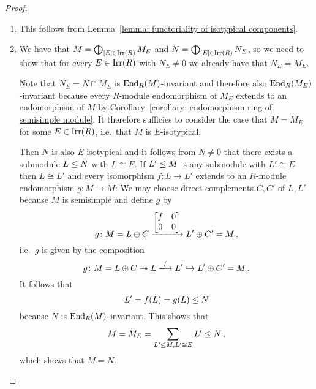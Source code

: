 \begin{proof}
  \leavevmode
  \begin{enumerate}
    \item
      This follows from Lemma~\ref{lemma: functoriality of isotypical components}.
    \item
      We have that $M = \bigoplus_{[E] \in \operatorname{Irr}(R)} M_E$ and $N = \bigoplus_{[E] \in \operatorname{Irr}(R)} N_E$, so we need to show that for every $E \in \operatorname{Irr}(R)$ with $N_E \neq 0$ we already have that $N_E = M_E$.
      
      Note that $N_E = N \cap M_E$ is $\operatorname{End}_{R}(M)$-invariant and therefore also $\operatorname{End}_{R}(M_E)$-invariant because every $R$-module endomorphism of $M_E$ extends to an endomorphism of $M$ by Corollary~\ref{corollary: endomorphism ring of semisimple module}. 
      It therefore sufficies to consider the case that $M = M_E$ for some $E \in \operatorname{Irr}(R)$, i.e.\ that $M$ is $E$-isotypical.
      
      Then $N$ is also $E$-isotypical and it follows from $N \neq 0$ that there exists a submodule $L \leq N$ with $L \cong E$.
      If $L' \leq M$ is any submodule with $L' \cong E$ then $L \cong L'$ and every isomorphism $f \colon L \to L'$ extends to an $R$-module endomorphism $g \colon M \to M$:
      We may choose direct complements $C, C'$ of $L, L'$ because $M$ is semisimple and define $g$ by
      \[
                g
        \colon  M
        =       L \oplus C
        \xlongrightarrow{ \begin{bmatrix} f & 0 \\ 0 & 0 \end{bmatrix} }
                L' \oplus C'
        =       M \,,
      \]
      i.e.\ $g$ is given by the composition
      \[
                            g
        \colon              M
        =                   L \oplus C
        \projection         L
        \xlongrightarrow{f} L'
        \inclusion          L' \oplus C'
        =                   M \,.
      \]
      It follows that
      \[
                    L'
        =           f(L)
        =           g(L)
        \leq  N
      \]
      because $N$ is $\operatorname{End}_R(M)$-invariant.
      This shows that
      \[
                    M
        =           M_E
        =           \sum_{L' \leq M, L' \cong E} L'
        \leq  N \,,
      \]
      which shows that $M = N$.
    \qedhere
  \end{enumerate}
\end{proof}


